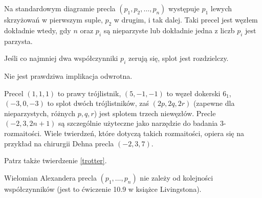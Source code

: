 Na standardowym diagramie precla $(p_1, p_2, \ldots, p_n)$ występuje $p_1$ lewych skrzyżowań w pierwszym suple, $p_2$ w drugim, i tak dalej.
Taki precel jest węzłem dokładnie wtedy, gdy $n$ oraz $p_i$ są nieparzyste lub dokładnie jedna z liczb $p_i$ jest parzysta.

\begin{proposition}
	Jeśli co najmniej dwa współczynniki $p_i$ zerują się, splot jest rozdzielczy.
\end{proposition}

Nie jest prawdziwa implikacja odwrotna.

Precel $(1,1,1)$ to prawy trójlistnik, $(5, -1, -1)$ to węzeł dokerski $6_1$, $(-3, 0, -3)$ to splot dwóch trójlistników, zaś $(2p, 2q, 2r)$ (zapewne dla nieparzystych, różnych $p, q, r$) jest splotem trzech niewęzłów.
Precle $(-2, 3, 2n+1)$ są szczególnie użyteczne jako narzędzie do badania 3-rozmaitości.
Wiele twierdzeń, które dotyczą takich rozmaitości, opiera się na przykład na chirurgii Dehna precla $(-2, 3, 7)$.

Patrz także twierdzenie \ref{trotter}.

Wielomian Alexandera precla $(p_1, \ldots, p_n)$ nie zależy od kolejności współczynników (jest to ćwiczenie 10.9 w książce Livingstona).